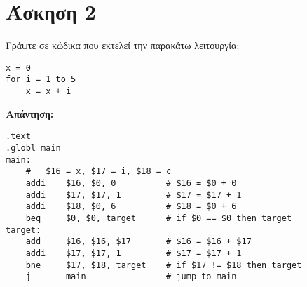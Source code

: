 \documentclass[a4paper,12pt]{article}
\begin{document}
\newpage
\section*{Άσκηση 2}
Γράψτε σε κώδικα που εκτελεί την παρακάτω λειτουργία:
\begin{lstlisting}
x = 0
for i = 1 to 5
    x = x + i
\end{lstlisting}
\textbf{Απάντηση:}
\begin{lstlisting}
.text
.globl main
main:
    #   $16 = x, $17 = i, $18 = c
    addi	$16, $0, 0			# $16 = $0 + 0
    addi	$17, $17, 1			# $17 = $17 + 1
    addi	$18, $0, 6			# $18 = $0 + 6
    beq		$0, $0, target  	# if $0 == $0 then target    
target:
    add		$16, $16, $17		# $16 = $16 + $17
    addi	$17, $17, 1			# $17 = $17 + 1
    bne		$17, $18, target	# if $17 != $18 then target
    j		main				# jump to main    
\end{lstlisting}
\end{document}
